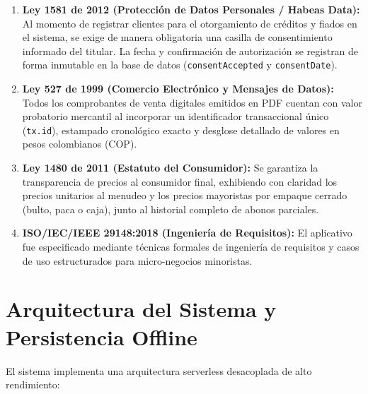 \documentclass[12pt,a4paper]{article}
\begin{document}
\begin{enumerate}
    \item \textbf{Ley 1581 de 2012 (Protección de Datos Personales / Habeas Data):} Al momento de registrar clientes para el otorgamiento de créditos y fiados en el sistema, se exige de manera obligatoria una casilla de consentimiento informado del titular. La fecha y confirmación de autorización se registran de forma inmutable en la base de datos (\texttt{consentAccepted} y \texttt{consentDate}).
    \item \textbf{Ley 527 de 1999 (Comercio Electrónico y Mensajes de Datos):} Todos los comprobantes de venta digitales emitidos en PDF cuentan con valor probatorio mercantil al incorporar un identificador transaccional único (\texttt{tx.id}), estampado cronológico exacto y desglose detallado de valores en pesos colombianos (COP).
    \item \textbf{Ley 1480 de 2011 (Estatuto del Consumidor):} Se garantiza la transparencia de precios al consumidor final, exhibiendo con claridad los precios unitarios al menudeo y los precios mayoristas por empaque cerrado (bulto, paca o caja), junto al historial completo de abonos parciales.
    \item \textbf{ISO/IEC/IEEE 29148:2018 (Ingeniería de Requisitos):} El aplicativo fue especificado mediante técnicas formales de ingeniería de requisitos y casos de uso estructurados para micro-negocios minoristas.
\end{enumerate}

\section{Arquitectura del Sistema y Persistencia Offline}

El sistema implementa una arquitectura serverless desacoplada de alto rendimiento:
\end{document}

